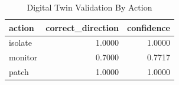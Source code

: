 \begin{table}
\caption{Digital Twin Validation By Action}
\label{tab:digital_twin_validation_by_action}
\begin{tabular}{lrr}
\toprule
action & correct_direction & confidence \\
\midrule
isolate & 1.0000 & 1.0000 \\
monitor & 0.7000 & 0.7717 \\
patch & 1.0000 & 1.0000 \\
\bottomrule
\end{tabular}
\end{table}
